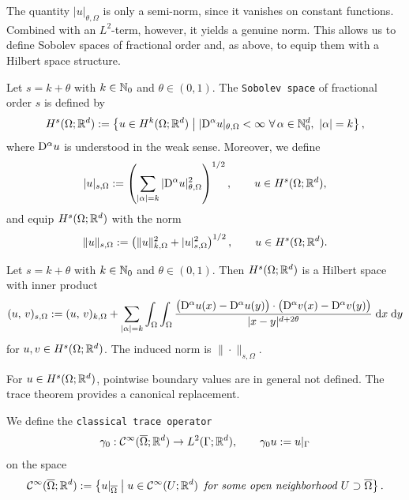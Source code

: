 The quantity $|u|_{\theta,\Omega}$ is only a semi-norm, since it vanishes on constant functions. Combined with an $L^2$-term, however, it yields a genuine norm. This allows us to define Sobolev spaces of fractional order and, as above, to equip them with a Hilbert space structure.

\begin{definition}\label{def:fractionalsobolev}
	Let $s=k+\theta$ with $k\in{\mathbb N}_0$ and $\theta\in(0,1)$. The {\tt Sobolev space} of fractional order $s$ is defined by
	\begin{equation*}
		H^s(\Omega;{\mathbb R}^d)
		:=
		\left\{
		u\in H^k(\Omega;{\mathbb R}^d)\;\middle|\; |{\mathrm{D}}^\alpha u|_{\theta,\Omega}<\infty \ \forall\,\alpha\in{\mathbb N}_0^d,\ |\alpha|=k
		\right\},
	\end{equation*}
	where ${\mathrm{D}}^\alpha u$ is understood in the weak sense. Moreover, we define
	\begin{equation*}
		|u|_{s,\Omega}
		:=
		\left(
		\sum_{|\alpha|=k} |{\mathrm{D}}^\alpha u|_{\theta,\Omega}^2
		\right)^{1/2},
		\qquad u\in H^s(\Omega;{\mathbb R}^d),
	\end{equation*}
	and equip $H^s(\Omega;{\mathbb R}^d)$ with the norm
	\begin{equation*}
		\|u\|_{s,\Omega}
		:=
		\left(
		\|u\|_{k,\Omega}^2 + |u|_{s,\Omega}^2
		\right)^{1/2},
		\qquad u\in H^s(\Omega;{\mathbb R}^d).
	\end{equation*}
\end{definition}

\begin{proposition}
	Let $s=k+\theta$ with $k\in{\mathbb N}_0$ and $\theta\in(0,1)$. Then $H^s(\Omega;{\mathbb R}^d)$ is a Hilbert space with inner product
	\begin{equation*}
		(u,\,v)_{s,\Omega}
		:=
		(u,\,v)_{k,\Omega}
		+
		\sum_{|\alpha|=k}
		\int_\Omega\int_\Omega
		\frac{\big({\mathrm{D}}^\alpha u(x)-{\mathrm{D}}^\alpha u(y)\big)\cdot\big({\mathrm{D}}^\alpha v(x)-{\mathrm{D}}^\alpha v(y)\big)}
		{|x-y|^{d+2\theta}}\;{{\mathrm{d}} x}\;{{\mathrm{d}} y}
	\end{equation*}
	for $u,v\in H^s(\Omega;{\mathbb R}^d)$. The induced norm is $\|\cdot\|_{s,\Omega}$.
	\eop
\end{proposition}

For $u\in H^s(\Omega;{\mathbb R}^d)$, pointwise boundary values are in general not defined. The trace theorem provides a canonical replacement.

\begin{definition}
	We define the {\tt classical trace operator}
	\begin{equation*}
		\gamma_0:{\mathcal C}^\infty(\overline{\Omega};{\mathbb R}^d)\to L^2(\Gamma;{\mathbb R}^d),
		\qquad
		\gamma_0 u:=u|_\Gamma
	\end{equation*}
	on the space
	\begin{equation*}
		{\mathcal C}^\infty(\overline{\Omega};{\mathbb R}^d)
		:=
		\left\{u|_{\overline{\Omega}}\;\middle|\;u\in {\mathcal C}^\infty(U;{\mathbb R}^d)\text{\em\enspace for some open neighborhood }U\supset\overline{\Omega}\right\}.
	\end{equation*}
\end{definition}

